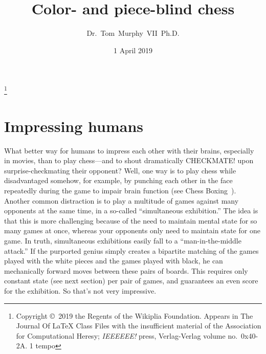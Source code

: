 \documentclass[twocolumn]{amsart}
\begin{document}
 

\title{Color- and piece-blind chess}
\author{Dr.~Tom~Murphy~VII~Ph.D.}\thanks{
Copyright \copyright\ 2019 the Regents of the Wikiplia Foundation.
Appears in The Journal Of LaTeX Class Files with the insufficient
material of the Association for Computational Heresy; {\em IEEEEEE!}
press, Verlag-Verlag volume no.~0x40-2A. 1 tempo}


\newcommand\checkmate{\hspace{-.05em}\raisebox{.4ex}{\tiny\bf ++}}

\renewcommand\th{\ensuremath{{}^{\textrm{th}}}}
\newcommand\st{\ensuremath{{}^{\textrm{st}}}}
\newcommand\rd{\ensuremath{{}^{\textrm{rd}}}}
\newcommand\nd{\ensuremath{{}^{\textrm{nd}}}}
\newcommand\at{\ensuremath{\scriptstyle @}}

\date{1 April 2019}

\maketitle \thispagestyle{empty}


\section{Impressing humans}

What better way for humans to impress each other with their brains,
especially in movies, than to play chess---and to shout dramatically
CHECKMATE! upon surprise-checkmating their opponent? Well, one way is
to play chess while disadvantaged somehow, for example, by punching
each other in the face repeatedly during the game to impair brain
function (see Chess Boxing~\cite{wikipediachessboxing}). Another common
distraction is to play a multitude of games against many opponents at
the same time, in a so-called ``simultaneous exhibition.'' The idea is
that this is more challenging because of the need to maintain mental
state for so many games at once, whereas your opponents only need to
maintain state for one game. In truth, simultaneous exhibitions easily
fall to a ``man-in-the-middle attack.'' If the purported genius simply
creates a bipartite matching of the games played with the white pieces
and the games played with black, he can mechanically forward moves
between these pairs of boards. This requires only constant state (see
next section) per pair of games, and guarantees an even score for the
exhibition. So that's not very impressive.
\end{document}
